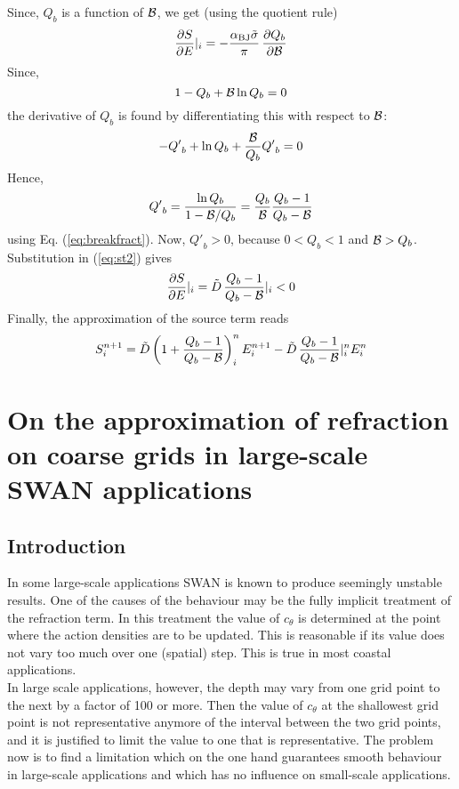 \documentclass[12pt]{book}
\begin{document}
Since, $Q_b$ is a function of ${\cal B}$, we get (using the quotient rule)
\begin{equation}
  \frac{\partial S}{\partial E} |_i = -\frac{\alpha_{\rm BJ} \tilde{\sigma}}{\pi}\, \frac{\partial Q_b}{\partial {\cal B}}
  \label{eq:st2}
\end{equation}
Since,
\begin{equation}
  1- Q_b + {\cal B} \ln Q_b = 0
  \label{eq:breakfract}
\end{equation}
the derivative of $Q_b$ is found by differentiating this with respect to ${\cal B}$:
\begin{equation}
  -{Q'}_{b} + \ln Q_b + \frac{\cal B}{Q_b} {Q'}_{b} = 0
\end{equation}
Hence,
\begin{equation}
  {Q'}_{b} = \frac{\ln Q_b}{1 - {\cal B}/Q_b} = \frac{Q_b}{\cal B} \frac{Q_b - 1}{Q_b - {\cal B}}
\end{equation}
using Eq. (\ref{eq:breakfract}). Now, ${Q'}_{b} > 0$, because $0 < Q_b < 1$ and ${\cal B} > Q_b$.
Substitution in (\ref{eq:st2}) gives
\begin{equation}
  \frac{\partial S}{\partial E} |_i = {\tilde D} \, \frac{Q_b - 1}{Q_b - {\cal B}} |_i < 0
\end{equation}
Finally, the approximation of the source term reads
\begin{equation}
  S^{n+1}_{i} = {\tilde D} \left( 1 + \frac{Q_b - 1}{Q_b - {\cal B}} \right)_i^n E_i^{n+1} - {\tilde D} \, \frac{Q_b - 1}{Q_b - {\cal B}} |^n_i E_i^n
\end{equation}

\section{On the approximation of refraction on coarse grids in large-scale SWAN applications}

\subsection{Introduction}

In some large-scale applications SWAN is known to produce seemingly unstable results. One of the causes of the behaviour may be the fully implicit treatment of the refraction term.
In this treatment the value of $c_\theta$ is determined at the point where the action densities are to be updated. This is reasonable if its value does not vary too much over one
(spatial) step. This is true in most coastal applications.
\\[2ex]
In large scale applications, however, the depth may vary from one grid point to the next by a factor of 100 or more. Then the value of $c_\theta$ at the shallowest grid point is
not representative anymore of the interval between the two grid points, and it is justified to limit the value to one that is representative. The problem now is to find
a limitation which on the one hand guarantees smooth behaviour in large-scale applications and which has no influence on small-scale applications.
\end{document}
